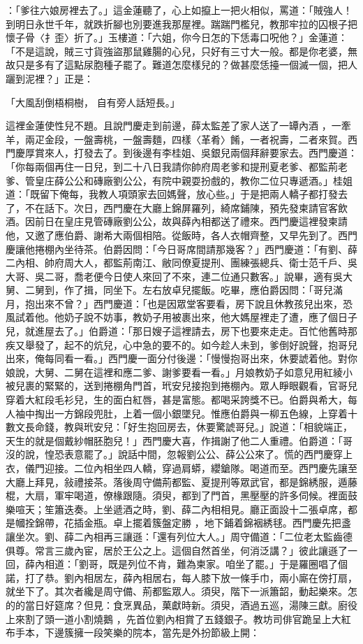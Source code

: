 \begin{showcontents}{}
：「爹往六娘房裡去了。」這金蓮聽了，心上如攛上一把火相似，罵道：「賊強人！到明日永世千年，就跌折腳也別要進我那屋裡。踹踹門檻兒，教那牢拉的囚根子把懷子骨〈扌歪〉折了。」玉樓道：「六姐，你今日怎的下恁毒口呪他？」金蓮道：「不是這說，賊三寸貨強盜那鼠雞腸的心兒，只好有三寸大一般。都是你老婆，無故只是多有了這點尿胞種子罷了。難道怎麼樣兒的？做甚麼恁擡一個滅一個，把人躧到泥裡？」正是：

「大風刮倒梧桐樹，  自有旁人話短長。」

這裡金蓮使性兒不題。且說門慶走到前邊，薛太監差了家人送了一罈內酒 ，一牽羊，兩疋金段，一盤壽桃，一盤壽麵，四樣〈革肴〉餚，一者祝壽，二者來賀。西門慶厚賞來人，打發去了。到後邊有李桂姐、吳銀兒兩個拜辭要家去。西門慶道：「你每兩個再住一日兒，到二十八日我請你帥府周老爹和提刑夏老爹、都監荊老爹、管皇庄薛公公和磚廠劉公公，有院中親耍扮戲的，教你二位只專遞酒。」桂姐道：「既留下俺每，我教人項頭家去回媽聲，放心些。」于是把兩人轎子都打發去了，不在話下。次日，西門慶在大廳上錦屏羅列，綺席鋪陳，預先發柬請官客飲酒。因前日在皇庄見管磚廠劉公公，故與薛內相都送了禮來。西門慶這裡發柬請他，又邀了應伯爵、謝希大兩個相陪。從飯時，各人衣帽齊整，又早先到了。西門慶讓他捲棚內坐待茶。伯爵因問：「今日哥席間請那幾客？」西門慶道：「有劉、薛二內相、帥府周大人，都監荊南江、敝同僚夏提刑、團練張總兵、衛士范千戶、吳大哥、吳二哥，喬老便今日使人來回了不來，連二位通只數客。」說畢，適有吳大舅、二舅到，作了揖，同坐下。左右放卓兒擺飯。吃畢，應伯爵因問：「哥兒滿月，抱出來不曾？」西門慶道：「也是因眾堂客要看，房下說且休教孩兒出來，恐風試着他。他奶子說不妨事，教奶子用被裹出來，他大媽屋裡走了遭，應了個日子兒，就進屋去了。」伯爵道：「那日嫂子這裡請去，房下也要來走走。百忙他舊時那疾又舉發了，起不的炕兒，心中急的要不的。如今趁人未到，爹倒好說聲，抱哥兒出來，俺每同看一看。」西門慶一面分付後邊：「慢慢抱哥出來，休要諕着他。對你娘說，大舅、二舅在這裡和應二爹、謝爹要看一看。」月娘教奶子如意兒用紅綾小被兒裹的緊緊的，送到捲棚角門首，玳安兒接抱到捲棚內。眾人睜眼觀看，官哥兒穿着大紅段毛衫兒，生的面白紅唇，甚是富態。都喝采誇獎不已。伯爵與希大，每人袖中掏出一方錦段兜肚，上着一個小銀墜兒。惟應伯爵與一柳五色線，上穿着十數文長命錢，教與玳安兒：「好生抱回房去，休要驚諕哥兒。」說道：「相貌端正，天生的就是個戴紗帽胚胞兒！」西門慶大喜，作揖謝了他二人重禮。伯爵道：「哥沒的說，惶恐表意罷了。」說話中間，忽報劉公公、薛公公來了。慌的西門慶穿上衣，儀門迎接。二位內相坐四人轎，穿過肩蟒，纓鎗隊。喝道而至。西門慶先讓至大廳上拜見，敍禮接茶。落後周守備荊都監、夏提刑等眾武官，都是錦綉服，遁藤棍，大扇，軍牢喝道，僚椽跟隨。須臾，都到了門首，黑壓壓的許多伺候。裡面鼓樂喧天；笙簫迭奏。上坐遞酒之時，劉、薛二內相相見。廳正面設十二張卓席，都是幗拴錦帶，花插金瓶。卓上擺着簇盤定勝 ，地下鋪着錦裀綉毬。西門慶先把盞讓坐次。劉、薛二內相再三讓遜：「還有列位大人。」周守備道：「二位老太監齒德俱尊。常言三歲內宦，居於王公之上。這個自然首坐，何消泛講？」彼此讓遜了一回，薛內相道：「劉哥，既是列位不肯，難為柬家。咱坐了罷。」于是羅圈唱了個諾，打了恭。劉內相居左，薛內相居右，每人膝下放一條手巾，兩小廝在傍打扇，就坐下了。其次者纔是周守備、荊都監眾人。須臾，階下一派簫韶，動起樂來。怎的的當日好筵席？但見：食烹異品，菓獻時新。須臾，酒過五巡，湯陳三獻。廚役上來割了頭一道小割燒鵝 ，先首位劉內相賞了五錢銀子。教坊司俳官跪呈上大紅布手本，下邊簇擁一段笑樂的院本，當先是外扮節級上開：


\end{showcontents}
